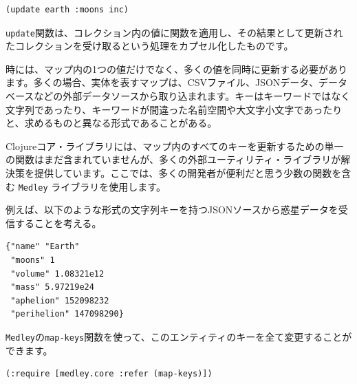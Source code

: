 \begin{lstlisting}[numbers=none]
(update earth :moons inc)
\end{lstlisting}

\texttt{update}関数は、コレクション内の値に関数を適用し、その結果として更新されたコレクションを受け取るという処理をカプセル化したものです。

時には、マップ内の1つの値だけでなく、多くの値を同時に更新する必要があります。多くの場合、実体を表すマップは、CSVファイル、JSONデータ、データベースなどの外部データソースから取り込まれます。キーはキーワードではなく文字列であったり、キーワードが間違った名前空間や大文字小文字であったりと、求めるものと異なる形式であることがある。

Clojureコア・ライブラリには、マップ内のすべてのキーを更新するための単一の関数はまだ含まれていませんが、多くの外部ユーティリティ・ライブラリが解決策を提供しています。ここでは、多くの開発者が便利だと思う少数の関数を含む \texttt{Medley} ライブラリを使用します。

例えば、以下のような形式の文字列キーを持つJSONソースから惑星データを受信することを考える。


\begin{lstlisting}[numbers=none]
{"name" "Earth"
 "moons" 1
 "volume" 1.08321e12
 "mass" 5.97219e24
 "aphelion" 152098232
 "perihelion" 147098290}
\end{lstlisting}

\texttt{Medley}の\texttt{map-keys}関数を使って、このエンティティのキーを全て変更することができます。

\begin{lstlisting}[numbers=none]
(:require [medley.core :refer (map-keys)])
\end{lstlisting}




















\begin{lstlisting}[numbers=none]

\end{lstlisting}





